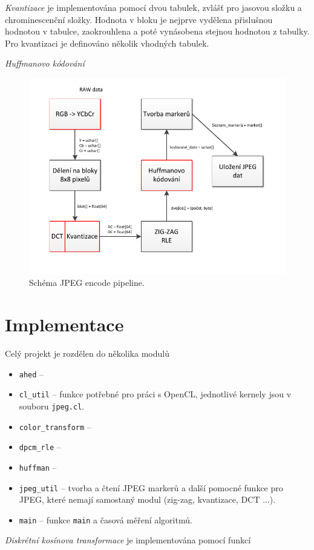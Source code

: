 \documentclass[a4paper,11pt]{article}
\begin{document}
\textit{Kvantizace} je implementována pomocí dvou tabulek, zvlášť pro jasovou složku a chrominescenční složky. Hodnota v 
bloku je nejprve vydělena přislušnou hodnotou v tabulce, zaokrouhlena a poté vynásobena stejnou hodnotou z tabulky.
Pro kvantizaci je definováno několik vhodných tabulek\cite{t81}.

\textit{Huffmanovo kódování}

\begin{figure}[H]
  \centering
  \includegraphics[width=15cm]{pipeline.pdf}
  \caption{Schéma JPEG encode pipeline.}
  \label{pipeline}
\end{figure}

\section{Implementace}
Celý projekt je rozdělen do několika modulů
\begin{itemize}
\item \texttt{ahed} -- 
\item \texttt{cl\_util} -- funkce potřebné pro práci s OpenCL, jednotlivé kernely jsou v souboru \texttt{jpeg.cl}.
\item \texttt{color\_transform} -- 
\item \texttt{dpcm\_rle} -- 
\item \texttt{huffman} -- 
\item \texttt{jpeg\_util} -- tvorba a čtení JPEG markerů a další pomocné funkce pro JPEG, které nemají samostaný
modul (zig-zag, kvantizace, DCT ...).
\item \texttt{main} -- funkce \texttt{main} a časová měření algoritmů.
\end{itemize}
\textit{Diskrétní kosínova transformace} je implementována pomocí funkcí
\end{document}
